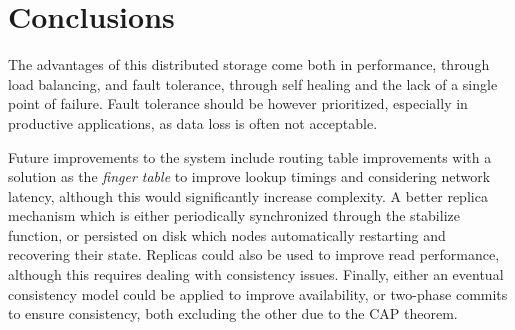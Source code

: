 \documentclass[a4paper, 11pt]{article}
\begin{document}
\section{Conclusions}

The advantages of this distributed storage come both in performance, through load balancing, and fault tolerance, through self healing and the lack of a single point of failure.
Fault tolerance should be however prioritized, especially in productive applications, as data loss is often not acceptable.

Future improvements to the system include routing table improvements with a solution as the \textit{finger table} to improve lookup timings and considering network latency, although this would significantly increase complexity.
A better replica mechanism which is either periodically synchronized through the stabilize function, or persisted on disk which nodes automatically restarting and recovering their state. Replicas could also be used to improve read performance, although this requires dealing with consistency issues.
Finally, either an eventual consistency model could be applied to improve availability, or two-phase commits to ensure consistency, both excluding the other due to the CAP theorem.
\end{document}

